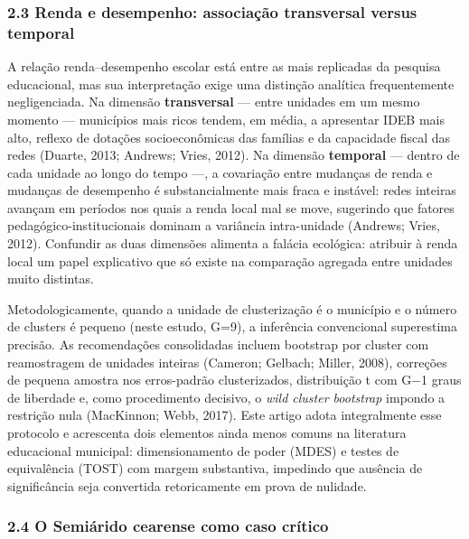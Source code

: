 \documentclass[
  brazilian,
  12pt,
  a4paper,
]{article}
\begin{document}
\subsubsection{2.3 Renda e desempenho: associação transversal versus
temporal}\label{renda-e-desempenho-associauxe7uxe3o-transversal-versus-temporal}

A relação renda--desempenho escolar está entre as mais replicadas da
pesquisa educacional, mas sua interpretação exige uma distinção
analítica frequentemente negligenciada. Na dimensão \textbf{transversal}
--- entre unidades em um mesmo momento --- municípios mais ricos tendem,
em média, a apresentar IDEB mais alto, reflexo de dotações
socioeconômicas das famílias e da capacidade fiscal das redes (Duarte,
2013; Andrews; Vries, 2012). Na dimensão \textbf{temporal} --- dentro de
cada unidade ao longo do tempo ---, a covariação entre mudanças de renda
e mudanças de desempenho é substancialmente mais fraca e instável: redes
inteiras avançam em períodos nos quais a renda local mal se move,
sugerindo que fatores pedagógico-institucionais dominam a variância
intra-unidade (Andrews; Vries, 2012). Confundir as duas dimensões
alimenta a falácia ecológica: atribuir à renda local um papel
explicativo que só existe na comparação agregada entre unidades muito
distintas.

Metodologicamente, quando a unidade de clusterização é o município e o
número de clusters é pequeno (neste estudo, G=9), a inferência
convencional superestima precisão. As recomendações consolidadas incluem
bootstrap por cluster com reamostragem de unidades inteiras (Cameron;
Gelbach; Miller, 2008), correções de pequena amostra nos erros-padrão
clusterizados, distribuição t com G−1 graus de liberdade e, como
procedimento decisivo, o \emph{wild cluster bootstrap} impondo a
restrição nula (MacKinnon; Webb, 2017). Este artigo adota integralmente
esse protocolo e acrescenta dois elementos ainda menos comuns na
literatura educacional municipal: dimensionamento de poder (MDES) e
testes de equivalência (TOST) com margem substantiva, impedindo que
ausência de significância seja convertida retoricamente em prova de
nulidade.

\subsubsection{2.4 O Semiárido cearense como caso
crítico}\label{o-semiuxe1rido-cearense-como-caso-cruxedtico}
\end{document}
